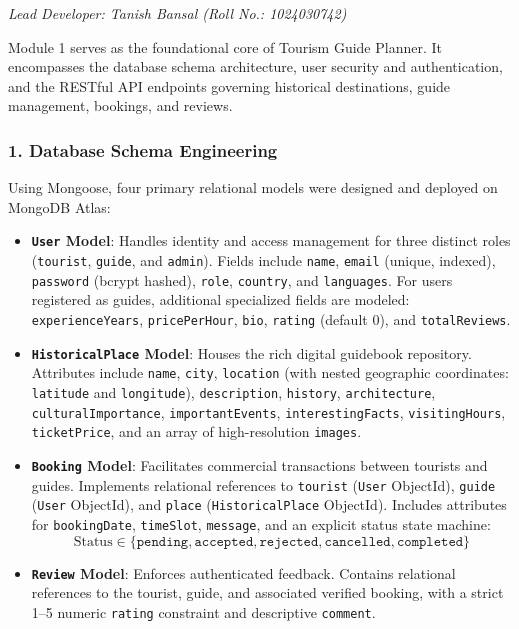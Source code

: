 \documentclass[12pt,a4paper,twoside,openright]{report}
\begin{document}
\textit{Lead Developer: Tanish Bansal (Roll No.: 1024030742)}

Module 1 serves as the foundational core of Tourism Guide Planner. It encompasses the database schema architecture, user security and authentication, and the RESTful API endpoints governing historical destinations, guide management, bookings, and reviews.

\subsubsection{1. Database Schema Engineering}
Using Mongoose, four primary relational models were designed and deployed on MongoDB Atlas:
\begin{itemize}[leftmargin=*]
    \item \textbf{\texttt{User} Model}: Handles identity and access management for three distinct roles (\texttt{tourist}, \texttt{guide}, and \texttt{admin}). Fields include \texttt{name}, \texttt{email} (unique, indexed), \texttt{password} (bcrypt hashed), \texttt{role}, \texttt{country}, and \texttt{languages}. For users registered as guides, additional specialized fields are modeled: \texttt{experienceYears}, \texttt{pricePerHour}, \texttt{bio}, \texttt{rating} (default 0), and \texttt{totalReviews}.
    \item \textbf{\texttt{HistoricalPlace} Model}: Houses the rich digital guidebook repository. Attributes include \texttt{name}, \texttt{city}, \texttt{location} (with nested geographic coordinates: \texttt{latitude} and \texttt{longitude}), \texttt{description}, \texttt{history}, \texttt{architecture}, \texttt{culturalImportance}, \texttt{importantEvents}, \texttt{interestingFacts}, \texttt{visitingHours}, \texttt{ticketPrice}, and an array of high-resolution \texttt{images}.
    \item \textbf{\texttt{Booking} Model}: Facilitates commercial transactions between tourists and guides. Implements relational references to \texttt{tourist} (\texttt{User} ObjectId), \texttt{guide} (\texttt{User} ObjectId), and \texttt{place} (\texttt{HistoricalPlace} ObjectId). Includes attributes for \texttt{bookingDate}, \texttt{timeSlot}, \texttt{message}, and an explicit status state machine:
    $$\text{Status} \in \{\texttt{pending}, \texttt{accepted}, \texttt{rejected}, \texttt{cancelled}, \texttt{completed}\}$$
    \item \textbf{\texttt{Review} Model}: Enforces authenticated feedback. Contains relational references to the tourist, guide, and associated verified booking, with a strict 1--5 numeric \texttt{rating} constraint and descriptive \texttt{comment}.
\end{itemize}
\end{document}
